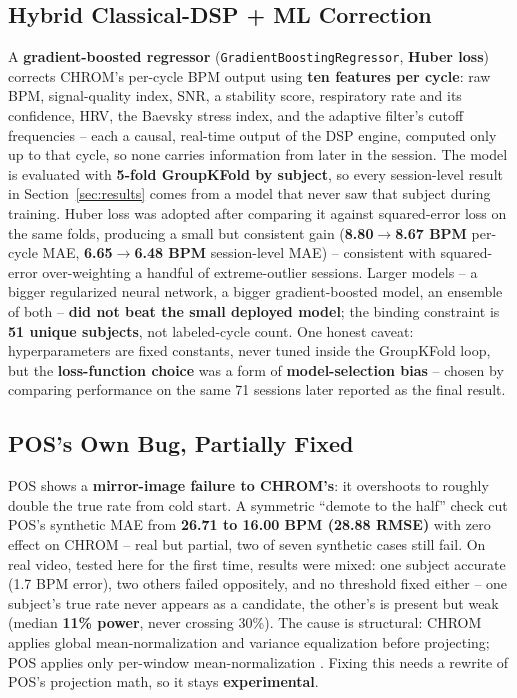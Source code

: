 \documentclass[conference]{IEEEtran}
\begin{document}
\subsection{\textbf{Hybrid Classical-DSP + ML Correction}}
A \textbf{gradient-boosted regressor} (\texttt{GradientBoostingRegressor}, \textbf{Huber loss}) corrects CHROM's per-cycle BPM output using \textbf{ten features per cycle}: raw BPM, signal-quality index, SNR, a stability score, respiratory rate and its confidence, HRV, the Baevsky stress index, and the adaptive filter's cutoff frequencies -- each a causal, real-time output of the DSP engine, computed only up to that cycle, so none carries information from later in the session. The model is evaluated with \textbf{5-fold GroupKFold by subject}, so every session-level result in Section~\ref{sec:results} comes from a model that never saw that subject during training. Huber loss was adopted after comparing it against squared-error loss on the same folds, producing a small but consistent gain (\textbf{8.80$\to$8.67 BPM} per-cycle MAE, \textbf{6.65$\to$6.48 BPM} session-level MAE) -- consistent with squared-error over-weighting a handful of extreme-outlier sessions. Larger models -- a bigger regularized neural network, a bigger gradient-boosted model, an ensemble of both -- \textbf{did not beat the small deployed model}; the binding constraint is \textbf{51 unique subjects}, not labeled-cycle count. One honest caveat: hyperparameters are fixed constants, never tuned inside the GroupKFold loop, but the \textbf{loss-function choice} was a form of \textbf{model-selection bias} -- chosen by comparing performance on the same 71 sessions later reported as the final result.

\subsection{\textbf{POS's Own Bug, Partially Fixed}}
\label{sec:pos-results}
POS \cite{b_pos_principles} shows a \textbf{mirror-image failure to CHROM's}: it overshoots to roughly double the true rate from cold start. A symmetric ``demote to the half'' check cut POS's synthetic MAE from \textbf{26.71 to 16.00 BPM (28.88 RMSE)} with zero effect on CHROM -- real but partial, two of seven synthetic cases still fail. On real video, tested here for the first time, results were mixed: one subject accurate (1.7 BPM error), two others failed oppositely, and no threshold fixed either -- one subject's true rate never appears as a candidate, the other's is present but weak (median \textbf{11\% power}, never crossing 30\%). The cause is structural: CHROM applies global mean-normalization and variance equalization before projecting; POS applies only per-window mean-normalization \cite{b_qaadan}. Fixing this needs a rewrite of POS's projection math, so it stays \textbf{experimental}.
\end{document}
